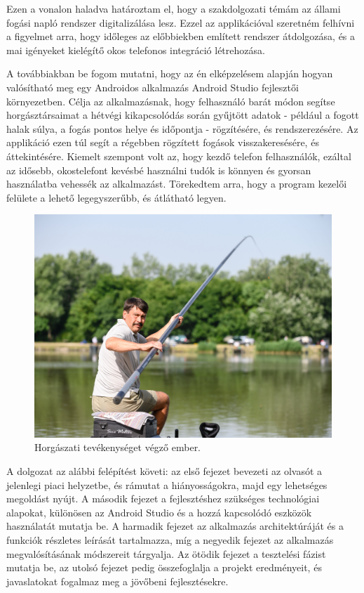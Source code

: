 Ezen a vonalon haladva határoztam el, hogy a szakdolgozati témám az állami fogási napló rendszer 
digitalizálása lesz. Ezzel az applikációval szeretném felhívni a figyelmet arra, hogy időleges
az előbbiekben említett rendszer átdolgozása, és a mai igényeket kielégítő okos telefonos integráció
létrehozása.

A továbbiakban be fogom mutatni, hogy az én elképzelésem alapján hogyan valósítható meg egy Androidos alkalmazás
Android Studio fejlesztői környezetben. Célja az alkalmazásnak, hogy felhasználó barát módon segítse horgásztársaimat a hétvégi kikapcsolódás során gyűjtött adatok - például a fogott halak súlya, a fogás pontos helye és időpontja - rögzítésére, és rendszerezésére. Az applikáció ezen túl segít a régebben rögzített fogások 
visszakeresésére, és áttekintésére. Kiemelt szempont volt az, hogy kezdő telefon felhasználók, ezáltal
az idősebb, okostelefont kevésbé használni tudók is könnyen és gyorsan használatba vehessék az alkalmazást. 
Törekedtem arra, hogy a program kezelői felülete a lehető legegyszerűbb, és átlátható legyen.

\begin{figure}[h]
\centering
\includegraphics[scale=0.2]{images/horgaszat.jpg}
\caption{Horgászati tevékenységet végző ember.}
\label{fig:horgasz}
\end{figure}

A dolgozat az alábbi felépítést követi: az első fejezet bevezeti az olvasót a jelenlegi piaci helyzetbe, és 
rámutat a hiányosságokra, majd egy lehetséges megoldást nyújt. A második fejezet a fejlesztéshez szükséges 
technológiai alapokat, különösen az Android Studio és a hozzá kapcsolódó eszközök használatát mutatja be. A 
harmadik fejezet az alkalmazás architektúráját és a funkciók részletes leírását tartalmazza, míg a negyedik 
fejezet az alkalmazás megvalósításának módszereit tárgyalja. Az ötödik fejezet a tesztelési fázist mutatja be,
az utolsó fejezet pedig összefoglalja a projekt eredményeit, és javaslatokat fogalmaz meg a jövőbeni fejlesztésekre.